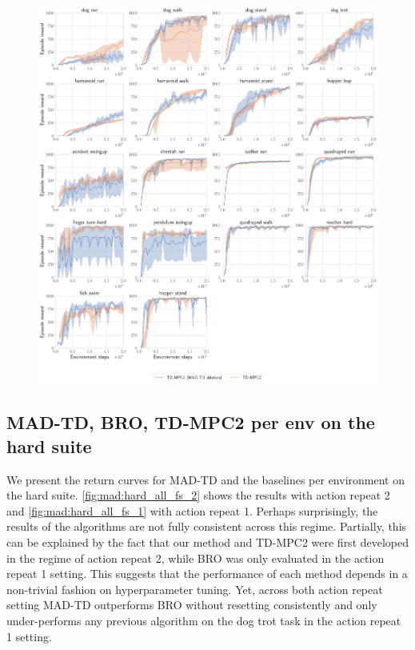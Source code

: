 \begin{figure}[H]
    \centering
    \includegraphics[width=\linewidth]{figures/mad-td/ablation.pdf}
    \caption{}
    \label{fig:mad:tdmpc_ablation}
\end{figure}


\subsection{MAD-TD, BRO, TD-MPC2 per env on the hard suite}
\label{app:results_base}

We present the return curves for MAD-TD and the baselines per environment on the hard suite.
\autoref{fig:mad:hard_all_fs_2} shows the results with action repeat 2 and \autoref{fig:mad:hard_all_fs_1} with action repeat 1. 
Perhaps surprisingly, the results of the algorithms are not fully consistent across this regime. 
Partially, this can be explained by the fact that our method and TD-MPC2 were first developed in the regime of action repeat 2, while BRO was only evaluated in the action repeat 1 setting.
This suggests that the performance of each method depends in a non-trivial fashion on hyperparameter tuning.
Yet, across both action repeat setting MAD-TD outperforms BRO without resetting consistently and only under-performs any previous algorithm on the dog trot task in the action repeat 1 setting.

